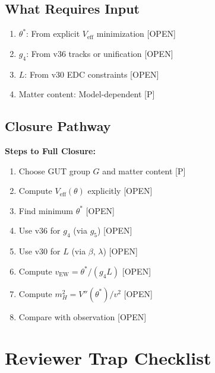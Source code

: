\documentclass[11pt,a4paper]{article}
\newcommand{\tagP}{\textcolor{green!50!black}{[P]}}
\newcommand{\tagOPEN}{\textcolor{red!70!black}{[OPEN]}}
\begin{document}
\subsection{What Requires Input}

\begin{enumerate}
    \item $\theta^*$: From explicit $V_{\text{eff}}$ minimization \tagOPEN
    \item $g_4$: From v36 tracks or unification \tagOPEN
    \item $L$: From v30 EDC constraints \tagOPEN
    \item Matter content: Model-dependent \tagP
\end{enumerate}

\subsection{Closure Pathway}

\begin{roadmapbox}
\textbf{Steps to Full Closure:}
\begin{enumerate}
    \item Choose GUT group $G$ and matter content \tagP
    \item Compute $V_{\text{eff}}(\theta)$ explicitly \tagOPEN
    \item Find minimum $\theta^*$ \tagOPEN
    \item Use v36 for $g_4$ (via $g_5$) \tagOPEN
    \item Use v30 for $L$ (via $\beta$, $\lambda$) \tagOPEN
    \item Compute $v_{\text{EW}} = \theta^*/(g_4 L)$ \tagOPEN
    \item Compute $m_H^2 = V''(\theta^*)/v^2$ \tagOPEN
    \item Compare with observation \tagOPEN
\end{enumerate}
\end{roadmapbox}

\section{Reviewer Trap Checklist}
\end{document}
